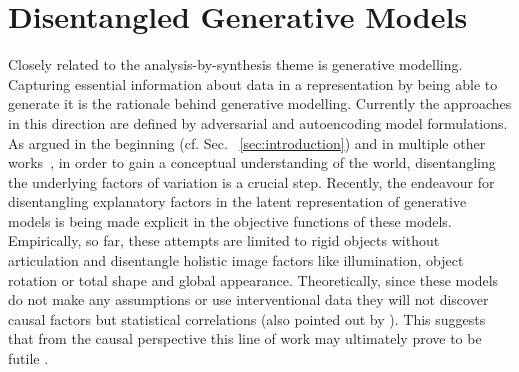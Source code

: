 \section{Disentangled Generative Models}
	Closely related to the analysis-by-synthesis theme is generative modelling.
	Capturing essential information about data in a representation by being able to generate it is the rationale behind generative modelling.
	Currently the approaches in this direction are defined by adversarial \cite{goodfellow16dlb} and autoencoding \cite{kingma13vae} model formulations.
	As argued in the beginning (cf. Sec. ~\ref{sec:introduction}) and in multiple other works~\cite{desjardins12genentangle, bengio13rep, chen16infogan, higgins16betavae, eastwood18disquantify}, in order to gain a conceptual understanding of the world, disentangling the underlying factors of variation is a crucial step.
	Recently, the endeavour for disentangling explanatory factors in the latent representation of generative models is being made explicit in the objective functions \cite{burgess18betavae, chen16infogan, higgins16betavae} of these models.
	Empirically, so far, these attempts are limited to rigid objects without articulation and disentangle holistic image factors like illumination, object rotation or total shape and global appearance.
	Theoretically, since these models do not make any assumptions or use interventional data they will not discover causal factors but statistical correlations (also pointed out by \cite{li18analogy}).
	This suggests that from the causal perspective this line of work may ultimately prove to be futile \cite{locatello18challenging}.


